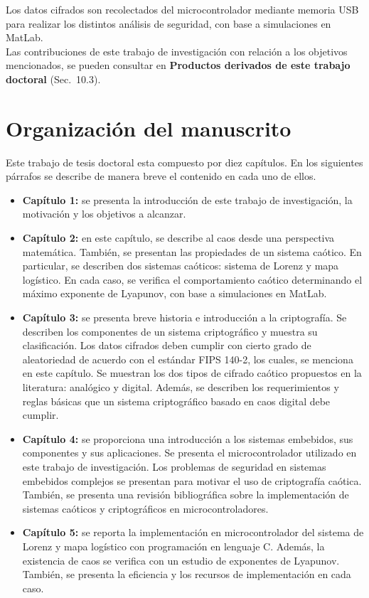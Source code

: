 Los datos cifrados son recolectados del microcontrolador mediante memoria USB para realizar los distintos análisis de seguridad, con base a simulaciones en MatLab. \\

Las contribuciones de este trabajo de investigación con relación a los objetivos mencionados, se pueden consultar en \textbf{Productos derivados de este trabajo doctoral} (Sec.~10.3).

\section{Organización del manuscrito}
Este trabajo de tesis doctoral esta compuesto por diez capítulos. En los siguientes párrafos se describe de manera breve el contenido en cada uno de ellos.
\begin{itemize}
\item \textbf{Capítulo 1:} se presenta la introducción de este trabajo de investigación, la motivación y los objetivos a alcanzar.  
\item \textbf{Capítulo 2:} en este capítulo, se describe al caos desde una perspectiva matemática. También, se presentan las propiedades de un sistema caótico. En particular, se describen dos sistemas caóticos: sistema de Lorenz y mapa logístico. En cada caso, se verifica el comportamiento caótico determinando el máximo exponente de Lyapunov, con base a simulaciones en MatLab. 
\item \textbf{Capítulo 3:} se presenta breve historia e introducción a la criptografía. Se describen los componentes de un sistema criptográfico y muestra su clasificación. Los datos cifrados deben cumplir con cierto grado de aleatoriedad de acuerdo con el estándar FIPS 140-2, los cuales, se menciona en este capítulo. Se muestran los dos tipos de cifrado caótico propuestos en la literatura: analógico y digital. Además, se describen los requerimientos y reglas básicas que un sistema criptográfico basado en caos digital debe cumplir.
\item \textbf{Capítulo 4:} se proporciona una introducción a los sistemas embebidos, sus componentes y sus aplicaciones. Se presenta el microcontrolador utilizado en este trabajo de investigación. Los problemas de seguridad en sistemas embebidos complejos se presentan para motivar el uso de criptografía caótica. También, se presenta una revisión bibliográfica sobre la implementación de sistemas caóticos y criptográficos en microcontroladores.
\item \textbf{Capítulo 5:} se reporta la implementación en microcontrolador del sistema de Lorenz y mapa logístico con programación en lenguaje C. Además, la existencia de caos se verifica con un estudio de exponentes de Lyapunov. También, se presenta la eficiencia y los recursos de implementación en cada caso.

\end{itemize}
